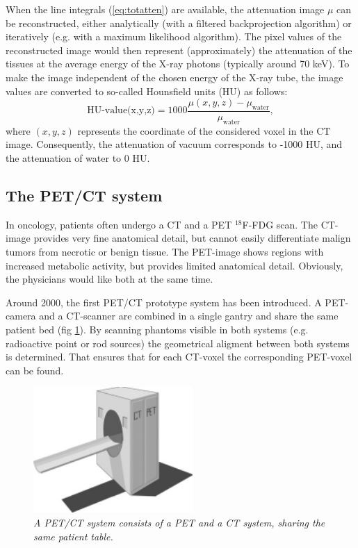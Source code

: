 When the line integrals (\ref{eq:totatten}) are available, the
attenuation image $\mu$ can be reconstructed, either analytically
(with a filtered backprojection algorithm) or iteratively (e.g. with a
maximum likelihood algorithm). The pixel values of the reconstructed
image would then represent (approximately) the attenuation of the
tissues at the average energy of the X-ray photons (typically around
70 keV). To make the image independent of the chosen energy of the
X-ray tube, the image values are converted to so-called Hounsfield
units (HU) as follows:
\begin{equation}
  \mbox{HU-value(x,y,z)} 
    = 1000 \frac{\mu(x,y,z) - \mu_{\mbox{water}}}{\mu_{\mbox{water}}},
\end{equation}
where $(x,y,z)$ represents the coordinate of the considered voxel in
the CT image.  Consequently, the attenuation of vacuum corresponds to
-1000 HU, and the attenuation of water to 0 HU.

\subsection{The PET/CT system}
In oncology, patients often undergo a CT and a PET $^{18}$F-FDG scan. The
CT-image provides very fine anatomical detail, but cannot easily differentiate
malign tumors from necrotic or benign tissue. The PET-image shows regions with
increased metabolic activity, but provides limited anatomical detail.
Obviously, the physicians would like both at the same time.

Around 2000, the first PET/CT prototype system has been introduced. A
PET-camera and a CT-scanner are combined in a single gantry and share
the same patient bed (fig \ref{fig:petct}). By scanning phantoms
visible in both systems (e.g. radioactive point or rod sources) the
geometrical aligment between both systems is determined. That ensures
that for each CT-voxel the corresponding PET-voxel can be found.
%
\begin{figure}[tbp]
\centering
\includegraphics[width=0.54\textwidth]{figs/fig_petct.pdf}
\caption{\label{fig:petct} \emph{A PET/CT system consists of a PET and
 a CT system, sharing the same patient table.}}
\end{figure}

